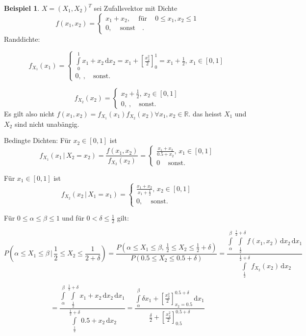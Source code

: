 \documentclass[12pt, a4paper]{article}
\theoremstyle{plain}
\theoremstyle{definition}
\newtheorem{beispiel}[thm]{Beispiel}
\newcommand{\R}{\mathbb{R}}
\newcommand{\1}{\mathds{1}}
\renewcommand{\d}{\,\mathrm{d}}
\providecommand{\mtext}[1]{\quad \text{#1} \quad}
\begin{document}
\begin{beispiel}

$ X = (X_1, X_2)^T $ sei Zufallsvektor mit Dichte 
\[ f(x_1, x_2) = \begin{cases} x_1 + x_2, \, \mtext{für} \, 0 \leq x_1, x_2 \leq 1  \\ 0, \, \mtext{sonst}. \end{cases}  \] 
Randdichte:

\end{beispiel}

\[ f_{X_1}(x_1) = \begin{cases} \int\limits_{0}^1 x_1+ x_2 \d x_2 = x_1 + [\frac{x_2^2}{2}]_0^1 = x_1 + \frac{1}{2}, \, x_1 \in [0,1] \\ 0, \ ,\mtext{sonst.} \end{cases} \]

\[ f_{X_2}(x_2) = \begin{cases} x_2 + \frac{1}{2}, \, x_2 \in [0,1] \\ 0, \ ,\mtext{sonst.} \end{cases} \]
Es gilt also nicht $f(x_1, x_2) = f_{X_1}(x_1) f_{X_2}(x_2) \forall x_1, x_2 \in \R .$ das heisst $X_1$ und $X_2$ sind nicht unabängig.

Bedingte Dichten: Für $ x_2 \in [0,1]$ ist \[ f_{X_1}(x_1 \, | \,  X_2 = x_2) = \frac{f(x_1, x_2)}{f_{X_2}(x_2)} = \begin{cases} \frac{x_1 + x_2}{0.5 + x_2}, \, x_1 \in [0,1] \\0 \, \mtext{sonst.}  \end{cases} \]


Für $ x_1 \in [0,1]$ ist \[ f_{X_2}(x_2 \, | \, X_1 = x_1) = \begin{cases} \frac{x_1 + x_2}{x_1 + \frac{1}{2}}, \, x_2 \in [0,1] \\ 0, \, \mtext{sonst.} \end{cases} \]

Für $0 \leq \alpha \leq \beta \leq 1$ und für $0<\delta \leq \frac{1}{2}$ gilt:

\[ P (\alpha \leq X_1 \leq \beta\, | \, \frac{1}{2} \leq X_2 \leq \frac{1}{2 + \delta} )  = \frac{ P( \alpha \leq X_1 \leq \beta, \, \frac{1}{2} \leq X_2 \leq \frac{1}{2} + \delta )}{P(0.5 \leq X_2 \leq 0.5 + \delta)}  = \frac{\int\limits_\alpha^\beta \int\limits_{\frac{1}{2}}^{\frac{1}{2} + \delta} f(x_1, x_2) \d x_2 \d x_1}  {  \int\limits_{\frac{1}{2}}^{\frac{1}{2} + \delta} f_{X_2} (x_2) \d x_2 }  \]  

\[ = \frac{\int\limits_\alpha^\beta \int\limits_{\frac{1}{2}}^{\frac{1}{2} + \delta} x_1 + x_2 \d x_2 \d x_1}  {  \int\limits_{\frac{1}{2}}^{\frac{1}{2} + \delta} 0.5 + x_2  \d x_2 } =   \frac{\int\limits_{\alpha}^{\beta} \delta x_1 + [\frac{x_2^2}{2}]_{x_2 = 0.5}^{0.5 + \delta} \d x_1}  { \frac{\delta}{2} + [\frac{x_2^2}{2}]_{0.5}^{0.5 + \delta} } \]
\end{document}
